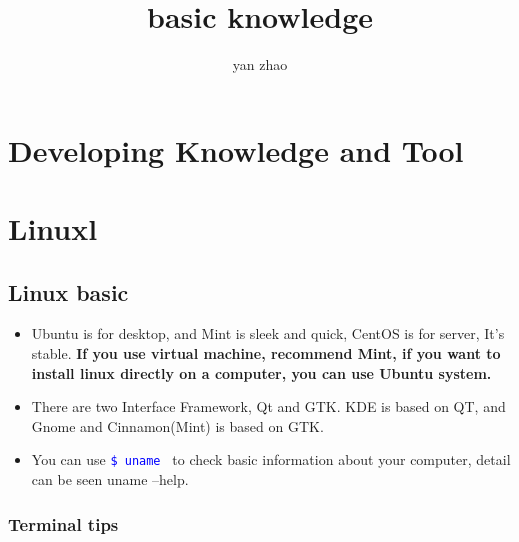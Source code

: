 \documentclass[a4paper,12pt,twoside]{book}
\newcommand{\linuxcommand}[1]{\texttt{\textcolor{blue}{\$ #1 \Pisymbol{psy}{191}}}}
\begin{document}
\title{basic knowledge}
\author{yan zhao}
\date{}\maketitle

\else
\chapter{Developing Knowledge and Tool}
\fi

\chapter{Linuxl}
\section{Linux basic}
\begin{itemize}
		\item Ubuntu is for desktop, and Mint is sleek and quick, CentOS is for server, It's stable. \textbf{If you use virtual machine, recommend Mint, if you want to install linux directly on a computer, you can use Ubuntu system.}

\item There are two Interface Framework, Qt and GTK\@.  KDE is based on QT, and Gnome and Cinnamon(Mint) is based on GTK.  

\item You can use \linuxcommand{uname} to check basic information about your computer, detail can be seen uname --help. 
\end{itemize}
\subsection{Terminal tips}
\end{document}
